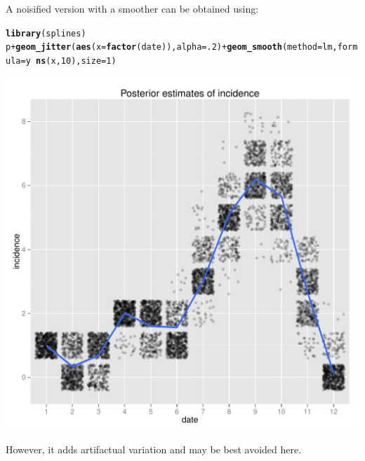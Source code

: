 \documentclass{article}\usepackage[]{graphicx}\usepackage[]{color}
\makeatletter
\newcommand{\hlnum}[1]{\textcolor[rgb]{0.686,0.059,0.569}{#1}}%
\newcommand{\hlopt}[1]{\textcolor[rgb]{0,0,0}{#1}}%
\newcommand{\hlstd}[1]{\textcolor[rgb]{0.345,0.345,0.345}{#1}}%
\newcommand{\hlkwc}[1]{\textcolor[rgb]{0.333,0.667,0.333}{#1}}%
\newcommand{\hlkwd}[1]{\textcolor[rgb]{0.737,0.353,0.396}{\textbf{#1}}}%
\newenvironment{kframe}{%
 \def\at@end@of@kframe{}%
 \ifinner\ifhmode%
  \def\at@end@of@kframe{\end{minipage}}%
  \begin{minipage}{\columnwidth}%
 \fi\fi%
 \def\FrameCommand##1{\hskip\@totalleftmargin \hskip-\fboxsep
 \colorbox{shadecolor}{##1}\hskip-\fboxsep
     \hskip-\linewidth \hskip-\@totalleftmargin \hskip\columnwidth}%
 \MakeFramed {\advance\hsize-\width
   \@totalleftmargin\z@ \linewidth\hsize
   \@setminipage}}%
 {\par\unskip\endMakeFramed%
 \at@end@of@kframe}
\newenvironment{knitrout}{}{} %
\makeatother
\begin{document}
A noisified version with a smoother can be obtained using:
\begin{knitrout}
\color{fgcolor}\begin{kframe}
\begin{alltt}
\hlkwd{library}\hlstd{(splines)}
\hlstd{p} \hlopt{+} \hlkwd{geom_jitter}\hlstd{(}\hlkwd{aes}\hlstd{(}\hlkwc{x}\hlstd{=}\hlkwd{factor}\hlstd{(date)),} \hlkwc{alpha}\hlstd{=}\hlnum{.2}\hlstd{)} \hlopt{+} \hlkwd{geom_smooth}\hlstd{(}\hlkwc{method}\hlstd{=lm,} \hlkwc{formula}\hlstd{=y}\hlopt{~}\hlkwd{ns}\hlstd{(x,}\hlnum{10}\hlstd{),} \hlkwc{size}\hlstd{=}\hlnum{1}\hlstd{)}
\end{alltt}
\end{kframe}

{\centering \includegraphics[width=.6\textwidth]{figs/unnamed-chunk-50} 

}



\end{knitrout}

However, it adds artifactual variation and may be best avoided here.
\end{document}
